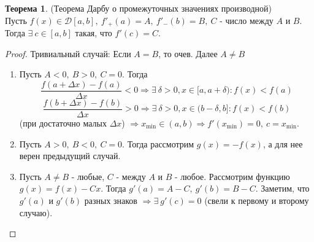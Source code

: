 \documentclass[a4paper, 12pt]{article}
\theoremstyle{definition}
\newtheorem*{theorem}{Теорема}
\begin{document}
        \begin{theorem} (Теорема Дарбу о промежуточных значениях производной)\\
            Пусть $f(x)\in \mathcal{D}[a,b],\ f'_+(a)=A,\ f'_-(b)=B,\ C$ - число между $A$ и $B$. Тогда $\exists\ c\in [a,b]$ такая, что $f'(c)=C$.
        \end{theorem} 
        \begin{proof}
            Тривиальный случай: Если $A=B$, то очев. Далее $A\ne B$
            \begin{enumerate}
                \item Пусть $A<0,\ B>0,\ C=0$. Тогда
                \[\frac{f(a+\Delta x)-f(a)}{\Delta x}<0 \Rightarrow \exists\ \delta>0, x\in [a,a+\delta): f(x)<f(a)\] 
                \[\frac{f(b+\Delta x)-f(b)}{\Delta x}>0 \Rightarrow \exists\ \delta>0, x\in (b-\delta, b]: f(x)<f(b)\]
                (при достаточно малых $\Delta x$)
                $\Rightarrow x_{\min}\in(a,b) \Rightarrow f'(x_{\min})=0,\ c=x_{\min}$.
                \item Пусть $A>0,\ B<0,\ C=0$. Тогда рассмотрим $g(x)=-f(x)$, а для нее верен предыдущий случай.
                \item Пусть $A\ne B$ - любые, $C$ - между $A$ и $B$ - любое. Рассмотрим функцию $g(x)=f(x)-Cx$. Тогда $g'(a)=A-C,\ g'(b)=B-C$. Заметим, что $g'(a)$ и $g'(b)$ разных знаков $\Rightarrow \exists\ g'(c)=0$ (свели к первому и второму случаю).
            \end{enumerate}
        \end{proof} 
\end{document}
